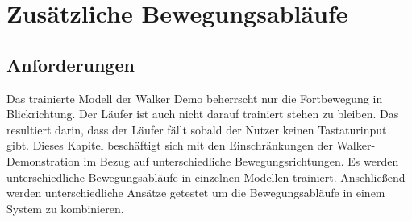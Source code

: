 \section{Zusätzliche Bewegungsabläufe}
\subsection{Anforderungen}
Das trainierte Modell der Walker Demo beherrscht nur die Fortbewegung in Blickrichtung. Der Läufer ist auch nicht darauf trainiert stehen zu bleiben. Das resultiert darin, dass der Läufer fällt sobald der Nutzer keinen Tastaturinput gibt. Dieses Kapitel beschäftigt sich mit den Einschränkungen der Walker-Demonstration im Bezug auf unterschiedliche Bewegungsrichtungen. Es werden unterschiedliche Bewegungsabläufe in einzelnen Modellen trainiert. Anschließend werden unterschiedliche Ansätze getestet um die Bewegungsabläufe in einem System zu kombinieren.




